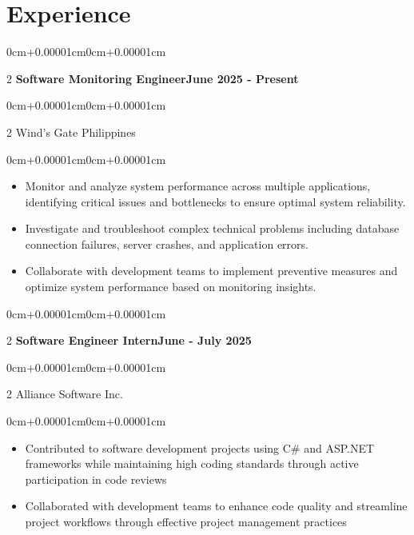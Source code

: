 \documentclass[11pt, letterpaper]{article}
\newenvironment{highlights}{\begin{itemize}[topsep=0.10cm,parsep=0.10cm,partopsep=0pt,itemsep=0pt,leftmargin=0cm+12pt]}{\end{itemize}}
\newenvironment{onecolentry}{\begin{adjustwidth}{0cm+0.00001cm}{0cm+0.00001cm}}{\end{adjustwidth}}
\newenvironment{twocolentry}[2][]{\onecolentry\def\secondColumn{#2}\setcolumnwidth{\fill,5.5cm}\begin{paracol}{2}}{\switchcolumn \raggedleft \secondColumn\end{paracol}\endonecolentry}
\begin{document}
\section{Experience}

    \begin{twocolentry}{\textbf{June 2025 - Present}}
    \textbf{Software Monitoring Engineer}\end{twocolentry}
    \vspace{0.05cm}
    \begin{twocolentry}{}
    Wind's Gate Philippines\end{twocolentry}
    \vspace{0.10cm}
    \begin{onecolentry}
        \begin{highlights}
            \item Monitor and analyze system performance across multiple applications, identifying critical issues and bottlenecks to ensure optimal system reliability.
            \item Investigate and troubleshoot complex technical problems including database connection failures, server crashes, and application errors.
            \item Collaborate with development teams to implement preventive measures and optimize system performance based on monitoring insights.
        \end{highlights}
    \end{onecolentry}
    \vspace{0.15cm}

    \begin{twocolentry}{\textbf{June - July 2025}}
    \textbf{Software Engineer Intern}\end{twocolentry}
    \vspace{0.05cm}
    \begin{twocolentry}{}
    Alliance Software Inc.\end{twocolentry}
    \vspace{0.10cm}
    \begin{onecolentry}
        \begin{highlights}
            \item Contributed to software development projects using C\# and ASP.NET frameworks while maintaining high coding standards through active participation in code reviews
            \item Collaborated with development teams to enhance code quality and streamline project workflows through effective project management practices
        \end{highlights}
    \end{onecolentry}
    \vspace{0.15cm}
\end{document}
